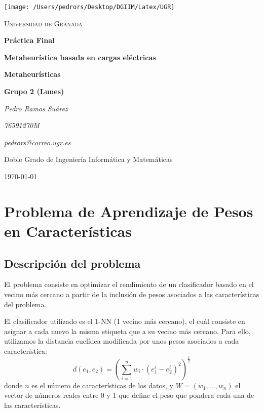 \documentclass[11pt,a4paper]{article}
\begin{document}
\begin{titlepage}
\centering
\texttt{[image: /Users/pedrors/Desktop/DGIIM/Latex/UGR]}\par\vspace{1cm}
{\scshape\LARGE Universidad de Granada \par}
\vspace{1cm}
{\Huge\bfseries Práctica Final\par}
{\Large\bfseries Metaheurística basada en cargas eléctricas
\par}
\vspace{1.5cm}
{\huge\bfseries Metaheurísticas\par}
{\large\bfseries Grupo 2 (Lunes)\par}
\vspace{2cm}
{\Large\itshape Pedro Ramos Suárez\par}
{\large\itshape 76591270M\par}
{\large\itshape pedrors@correo.ugr.es\par}
\vfill
Doble Grado de Ingeniería Informática y Matemáticas
\vfill
{\large \today \par}
\author{A}
\end{titlepage}

\tableofcontents
\newpage
\section{Problema de Aprendizaje de Pesos en Características} \label{sect:APC}

\subsection{Descripción del problema}

El problema consiste en optimizar el rendimiento de un clasificador basado en el vecino más cercano a partir de la inclusión de pesos asociados a las características del problema.

El clasificador utilizado es el 1-NN (1 vecino más cercano), el cuál consiste en asignar a cada nuevo la misma etiqueta que a su vecino más cercano. Para ello, utilizamos la distancia euclídea modificada por unos pesos asociados a cada característica:
$$d(e_{1}, e_{2}) = (\sum_{i=1}^{n} w_{i} \cdot (e_{1}^{i} - e_{2}^{i})^{2})^{\frac{1}{2}}$$
donde $n$ es el número de características de los datos, y $W = (w_{1}, \dots, w_{n})$ el vector de números reales entre 0 y 1 que define el peso que pondera cada una de las características.
\end{document}
